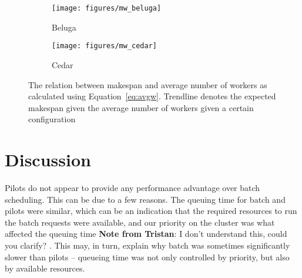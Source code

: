 \documentclass{IEEEtran}
\newcommand{\tristan}[1]{\color{red}\textbf{Note from Tristan}:
      #1 \color{black}}
\newcommand{\TG}[1]{\tristan{#1}}
\begin{document}
    \begin{figure*}
        \centering
        \begin{subfigure}[b]{0.475\textwidth}
            \centering
            \texttt{[image: figures/mw\_beluga]}
            \caption[]%
            {{\small Beluga}}
            \label{fig:mwbeluga}
        \end{subfigure}
        \hfill
        \begin{subfigure}[b]{0.475\textwidth}
            \centering
            \texttt{[image: figures/mw\_cedar]}
            \caption[]%
            {{\small Cedar}}
            \label{fig:mwcedar}
        \end{subfigure}
        \caption[]
        {\small The relation between makespan and average number of workers as 
        calculated using Equation~\ref{eq:avgw}. Trendline denotes the expected makespan
        given the average number of workers given a certain configuration}
        \label{fig:mwall}
    \end{figure*}

\section{Discussion}\label{sec:discussion}


Pilots do not appear to provide any performance advantage over batch scheduling.
This can be due to a few reasons. The queuing time for batch and pilots were similar, 
which can be an indication that the required resources to run the batch requests were
available, and our priority on the cluster was what affected the queuing time \TG{I don't understand this, could you clarify?}. This may, in turn,
explain why batch was sometimes significantly slower than pilots -- queueing time was not
only controlled by priority, but also by available resources.
\end{document}
